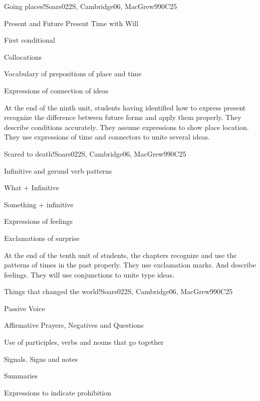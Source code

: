 \begin{syllabus}
\begin{unit}{Going places!}{}{Soars022S, Cambridge06, MacGrew99}{0}{C25}
   \begin{topics}
      \item Present and Future Present Time with Will
      \item First conditional
      \item Collocations
      \item Vocabulary of prepositions of place and time
      \item Expressions of connection of ideas
   \end{topics}

   \begin{learningoutcomes}
      \item At the end of the ninth unit, students having identified how to express present recognize the difference between future forms and apply them properly. They describe conditions accurately. They assume expressions to show place location. They use expressions of time and connectors to unite several ideas.
   \end{learningoutcomes}
\end{unit}

\begin{unit}{Scared to death!}{}{Soars022S, Cambridge06, MacGrew99}{0}{C25}
   \begin{topics}
      \item Infinitive and gerund verb patterns
      \item What + Infinitive
      \item Something + infinitive
      \item Expressions of feelings
      \item Exclamations of surprise
   \end{topics}

   \begin{learningoutcomes}
      \item At the end of the tenth unit of students, the chapters recognize and use the patterns of times in the past properly. They use exclamation marks. And describe feelings. They will use conjunctions to unite type ideas.
   \end{learningoutcomes}
\end{unit}

\begin{unit}{Things that changed the world!}{}{Soars022S, Cambridge06, MacGrew99}{0}{C25}
   \begin{topics}
       \item Passive Voice
       \item Affirmative Prayers, Negatives and Questions
       \item Use of participles, verbs and nouns that go together
       \item Signals. Signs and notes
       \item Summaries
       \item Expressions to indicate prohibition
    \end{topics}


\end{unit}
\end{syllabus}

